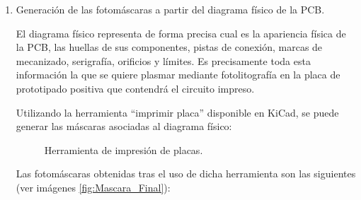 \begin{enumerate}
    \item Generación de las fotomáscaras a partir del diagrama físico de la \ac{PCB}.
    
    El diagrama físico representa de forma precisa cual es la apariencia física de la \ac{PCB}, las huellas de sus componentes, pistas de conexión, marcas de mecanizado, serigrafía, orificios y límites. Es precisamente toda esta información la que se quiere plasmar mediante fotolitografía en la placa de prototipado positiva que contendrá el circuito impreso.
    
    Utilizando la herramienta ``imprimir placa'' disponible en KiCad, se puede generar las máscaras asociadas al diagrama físico:
    
    \begin{figure}[H]
    \centering
    \caption{Herramienta de impresión de placas.} 
    \end{figure}
    
    Las fotomáscaras obtenidas tras el uso de dicha herramienta son las siguientes (ver imágenes \ref{fig:Mascara_Final}):
    

\end{enumerate}
